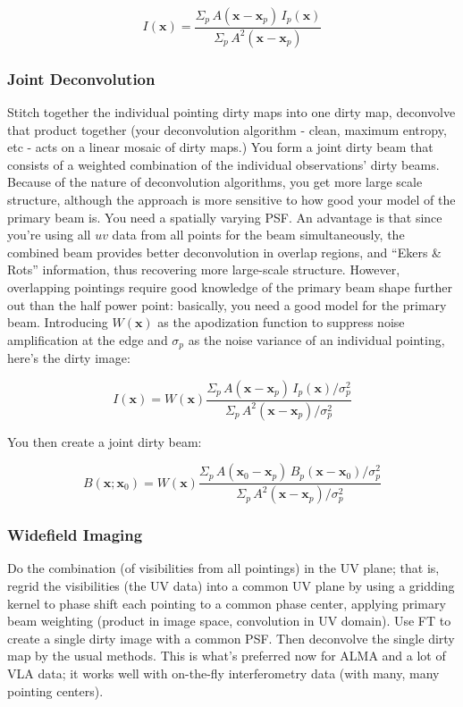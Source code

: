 \documentclass[a4paper]{article}
\newcommand{\xvec}{\mathbf{x}}
\begin{document}
\begin{equation}
I(\xvec) = \frac{\Sigma_p \, A(\xvec-\xvec_p) \, I_p (\xvec)}{\Sigma_p \, A^2 (\xvec - \xvec_p)}
\end{equation}

\subsubsection{Joint Deconvolution} 
Stitch together the individual pointing dirty maps into one dirty map, deconvolve that product together (your deconvolution algorithm - clean, maximum entropy, etc - acts on a linear mosaic of dirty maps.) You form a joint dirty beam that consists of a weighted combination of the individual observations' dirty beams. Because of the nature of deconvolution algorithms, you get more large scale structure, although the approach is more sensitive to how good your model of the primary beam is. You need a spatially varying PSF. An advantage is that since you're using all $uv$ data from all points for the beam simultaneously, the combined beam provides better deconvolution in overlap regions, and ``Ekers \& Rots'' information, thus recovering more large-scale structure. However, overlapping pointings require good knowledge of the primary beam shape further out than the half power point: basically, you need a good model for the primary beam.
Introducing $W(\mathbf{x})$ as the apodization function to suppress noise amplification at the edge and $\sigma_p$ as the noise variance of an individual pointing, here's the dirty image:

\begin{equation}
I(\xvec) = W(\xvec) \frac{\Sigma_p \, A(\xvec-\xvec_p) \, I_p (\xvec) / \sigma_p^2}{\Sigma_p \, A^2 (\xvec - \xvec_p) / \sigma_p^2}
\end{equation}

You then create a joint dirty beam:

\begin{equation}
B(\xvec; \xvec_0) = W(\xvec) \frac{\Sigma_p \, A(\xvec_0-\xvec_p) \, B_p (\xvec - \xvec_0) / \sigma_p^2}{\Sigma_p \, A^2 (\xvec - \xvec_p) / \sigma_p^2}
\end{equation}

\subsubsection{Widefield Imaging}
Do the combination (of visibilities from all pointings) in the UV plane; that is, regrid the visibilities (the UV data) into a common UV plane by using a gridding kernel to phase shift each pointing to a common phase center, applying primary beam weighting (product in image space, convolution in UV domain). Use FT to create a single dirty image with a common PSF. Then deconvolve the single dirty map by the usual methods. This is what's preferred now for ALMA and a lot of VLA data; it works well with on-the-fly interferometry data (with many, many pointing centers).
\end{document}
